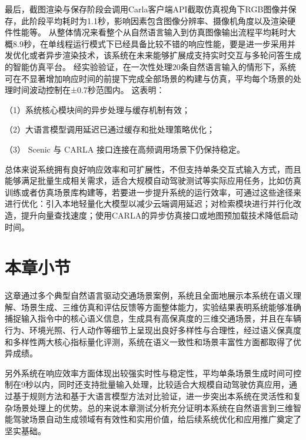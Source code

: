 最后，截图渲染与保存阶段会调用Carla客户端API截取仿真视角下RGB图像并保存，此阶段平均耗时为1.1秒，影响因素包含图像分辨率、摄像机角度以及渲染硬件性能等。
从整体情况来看整个从自然语言输入到仿真图像输出流程平均耗时大概8.9秒，在单线程运行模式下已经具备比较不错的响应性能，要是进一步采用并发优化或者异步渲染技术，该系统在未来能够扩展成支持实时交互与多轮问答生成的智能仿真平台。
经实验验证，在一次性处理20条自然语言输入的情形下，系统可在不显著增加响应时间的前提下完成全部场景的构建与仿真，平均每个场景的处理时间波动控制在±0.7秒范围内。
这表明：

（1）系统核心模块间的异步处理与缓存机制有效；

（2）大语言模型调用延迟已通过缓存和批处理策略优化；

（3） Scenic 与 CARLA 接口连接在高频调用场景下仍保持稳定。

总体来说系统拥有良好响应效率和可扩展性，不但支持单条交互式输入方式，而且能够满足批量生成相关需求，适合大规模自动驾驶测试等实际应用任务，比如仿真训练或者仿真场景库构建等，若要进一步提升系统的运行效率，可通过这些途径来进行优化：引入本地轻量化大模型以减少云端调用延迟；对检索模块进行并行化改造，提升向量查找速度；使用CARLA的异步仿真接口或地图预加载技术降低启动时间。


\section{本章小节}
这章通过多个典型自然语言驱动交通场景案例，系统且全面地展示本系统在语义理解、场景生成、三维仿真和评估反馈等方面整体能力，实验结果表明系统能够准确捕捉输入指令中的核心语义信息，生成具有高保真度的三维交通场景，并且在车辆行为、环境光照、行人动作等细节上呈现出良好多样性与合理性，经过语义保真度和多样性两大核心指标量化评测，系统在语义一致性和场景丰富性方面都取得了优异成绩。

另外系统在响应效率方面体现出较强实时性与稳定性，平均单条场景生成时间可控制在9秒以内，同时还支持批量输入处理，比较适合大规模自动驾驶仿真应用，通过基于规则方法和基于大语言模型方法对比验证，进一步突出本系统在灵活性和复杂场景处理上的优势。总的来说本章测试分析充分证明本系统在自然语言到三维智能驾驶场景自动生成领域有有效性和实用价值，给后续系统优化和应用推广奠定了坚实基础。












